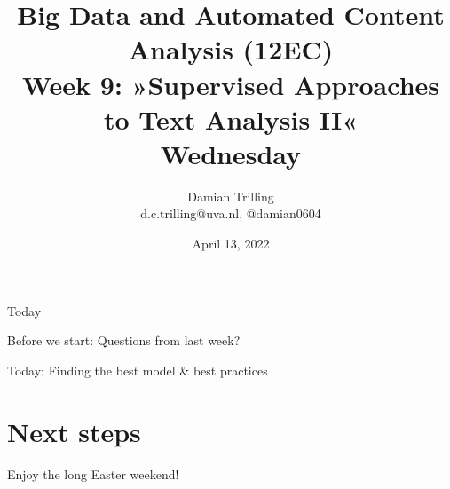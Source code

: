 

\graphicspath{{../../resources/img/}}




\title[Big Data and Automated Content Analysis]{\textbf{Big Data and Automated Content Analysis (12EC)} 
\\Week 9: »Supervised Approaches to Text Analysis II«
\\Wednesday}
\author[Damian Trilling]{Damian Trilling\\ \footnotesize{d.c.trilling@uva.nl, @damian0604 \\}}
\date{April 13, 2022}


\begin{frame}{}
	\titlepage
\end{frame}

\begin{frame}{Today}
	\tableofcontents
\end{frame}


\begin{frame}[standout]
Before we start: Questions from last week?
\end{frame}


\begin{frame}[standout]
Today: Finding the best model \& best practices
\end{frame}

















\section{Next steps}

\begin{frame}[standout]
Enjoy the long Easter weekend!
\end{frame}





\begin{frame}
	\printbibliography
\end{frame}




